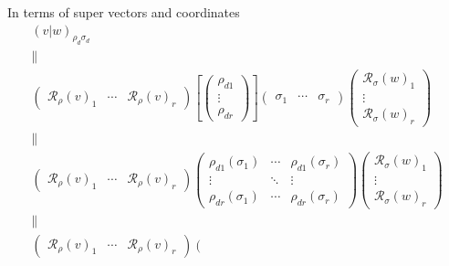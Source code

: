 \documentclass[aps,preprint]{revtex4}
\begin{document}
In terms of super vectors and coordinates \label{Matrix Form of Inner
Products} 
\begin{gather}
\left( \left. v\right\vert w\right) _{\rho _{d}\sigma _{d}} \\
\parallel \\
\left( 
\begin{array}{ccc}
\mathcal{R}_{\rho }\left( v\right) _{1} & \cdots & \mathcal{R}_{\rho }\left(
v\right) _{r}%
\end{array}%
\right) \left[ \left( 
\begin{array}{c}
\rho _{d1} \\ 
\vdots \\ 
\rho _{dr}%
\end{array}%
\right) \right] \left( 
\begin{array}{ccc}
\sigma _{1} & \cdots & \sigma _{r}%
\end{array}%
\right) \left( 
\begin{array}{c}
\mathcal{R}_{\sigma }\left( w\right) _{1} \\ 
\vdots \\ 
\mathcal{R}_{\sigma }\left( w\right) _{r}%
\end{array}%
\right) \\
\parallel \\
\left( 
\begin{array}{ccc}
\mathcal{R}_{\rho }\left( v\right) _{1} & \cdots & \mathcal{R}_{\rho }\left(
v\right) _{r}%
\end{array}%
\right) \left( 
\begin{array}{ccc}
\rho _{d1}\left( \sigma _{1}\right) & \cdots & \rho _{d1}\left( \sigma
_{r}\right) \\ 
\vdots & \ddots & \vdots \\ 
\rho _{dr}\left( \sigma _{1}\right) & \cdots & \rho _{dr}\left( \sigma
_{r}\right)%
\end{array}%
\right) \left( 
\begin{array}{c}
\mathcal{R}_{\sigma }\left( w\right) _{1} \\ 
\vdots \\ 
\mathcal{R}_{\sigma }\left( w\right) _{r}%
\end{array}%
\right) \\
\parallel \\
\left( 
\begin{array}{ccc}
\mathcal{R}_{\rho }\left( v\right) _{1} & \cdots & \mathcal{R}_{\rho }\left(
v\right) _{r}%
\end{array}%
\right) \left( 
\begin{array}{ccc}

\end{array}
\end{gather}
\end{document}
